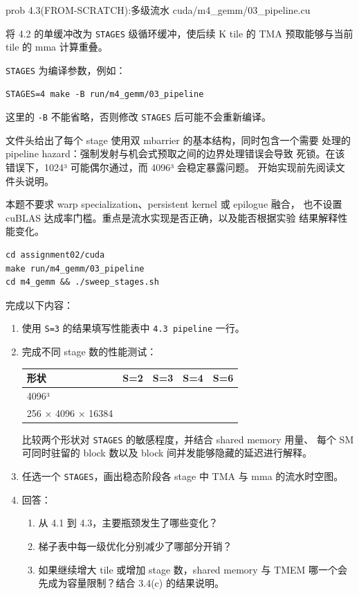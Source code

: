 \documentclass[11pt,a4paper,fontset=fandol]{ctexart}
\begin{document}
\begin{capstone}{prob 4.3(FROM-SCRATCH):多级流水 \hfill {\footnotesize\ttfamily cuda/m4\_gemm/03\_pipeline.cu}}

将 4.2 的单缓冲改为 \texttt{STAGES} 级循环缓冲，使后续 K tile 的 TMA
预取能够与当前 tile 的 mma 计算重叠。

\texttt{STAGES} 为编译参数，例如：

\begin{verbatim}
STAGES=4 make -B run/m4_gemm/03_pipeline
\end{verbatim}

这里的 \texttt{-\allowbreak{}B} 不能省略，否则修改 \texttt{STAGES}
后可能不会重新编译。

文件头给出了每个 stage 使用双 mbarrier 的基本结构，同时包含一个需要
处理的 pipeline hazard：强制发射与机会式预取之间的边界处理错误会导致
死锁。在该错误下，1024³ 可能偶尔通过，而 4096³ 会稳定暴露问题。
开始实现前先阅读文件头说明。

本题不要求 warp specialization、persistent kernel 或 epilogue 融合，
也不设置 cuBLAS 达成率门槛。重点是流水实现是否正确，以及能否根据实验
结果解释性能变化。

\begin{verbatim}
cd assignment02/cuda
make run/m4_gemm/03_pipeline
cd m4_gemm && ./sweep_stages.sh
\end{verbatim}

完成以下内容：

\begin{enumerate}
\def\labelenumi{\arabic{enumi}.}
\item
  使用 \texttt{S=\allowbreak{}3} 的结果填写性能表中
  \texttt{4.\allowbreak{}3\ pipeline} 一行。
\item
  完成不同 stage 数的性能测试：

  \begin{longtable}[]{@{}lllll@{}}
  \toprule\noalign{}
  形状 & S=2 & S=3 & S=4 & S=6 \\
  \midrule\noalign{}
  \endhead
  \bottomrule\noalign{}
  \endlastfoot
  4096³ & & & & \\
  256 × 4096 × 16384 & & & & \\
  \end{longtable}

  比较两个形状对 \texttt{STAGES} 的敏感程度，并结合 shared memory 用量、
  每个 SM 可同时驻留的 block 数以及 block 间并发能够隐藏的延迟进行解释。
\item
  任选一个 \texttt{STAGES}，画出稳态阶段各 stage 中 TMA 与 mma
  的流水时空图。
\item
  回答：

  \begin{enumerate}
  \def\labelenumii{(\alph{enumii})}
  \item
    从 4.1 到 4.3，主要瓶颈发生了哪些变化？
  \item
    梯子表中每一级优化分别减少了哪部分开销？
  \item
    如果继续增大 tile 或增加 stage 数，shared memory 与 TMEM
    哪一个会先成为容量限制？结合 3.4(c) 的结果说明。
  \end{enumerate}
\end{enumerate}

\end{capstone}
\end{document}
